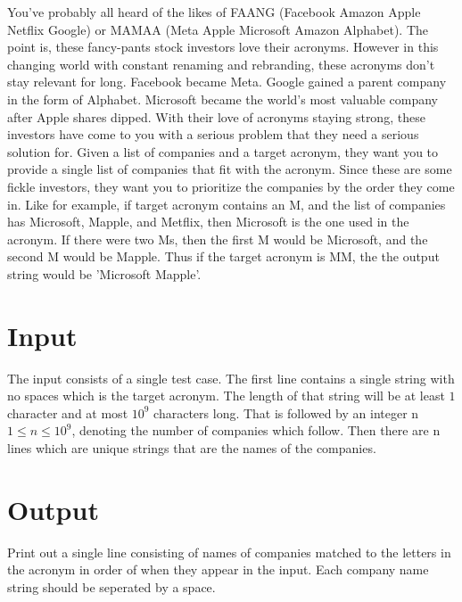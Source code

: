 
You've probably all heard of the likes of FAANG (Facebook Amazon Apple Netflix Google) or MAMAA (Meta Apple Microsoft Amazon Alphabet). The point is, these fancy-pants stock investors love their acronyms. However in this changing world with constant renaming and rebranding, these acronyms don't stay relevant for long. Facebook became Meta. Google gained a parent company in the form of Alphabet. Microsoft became the world's most valuable company after Apple shares dipped. With their love of acronyms staying strong, these investors have come to you with a serious problem that they need a serious solution for. Given a list of companies and a target acronym, they want you to provide a single list of companies that fit with the acronym. Since these are some fickle investors, they want you to prioritize the companies by the order they come in. Like for example, if target acronym contains an M, and the list of companies has Microsoft, Mapple, and Metflix, then Microsoft is the one used in the acronym. If there were two Ms, then the first M would be Microsoft, and the second M would be Mapple. Thus if the target acronym is MM, the the output string would be 'Microsoft Mapple'.

\section*{Input}

The input consists of a single test case. The first line contains a single string with no spaces which is the target acronym. The length of that string will be at least $1$ character and at most $10^{9}$ characters long. That is followed by an integer n $1 \le n \le 10^{9}$, denoting the number of companies which follow. Then there are n lines which are unique strings that are the names of the companies.

\section*{Output}

Print out a single line consisting of names of companies matched to the letters in the acronym in order of when they appear in the input. Each company name string should be seperated by a space.
